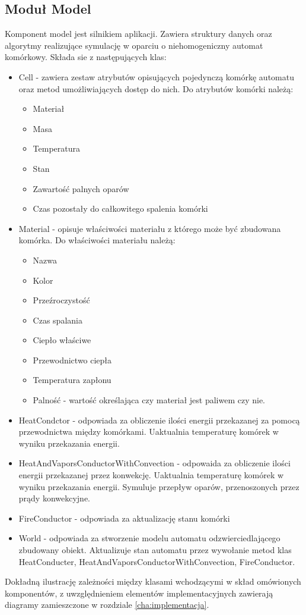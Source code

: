\subsection {Moduł Model}
Komponent model jest silnikiem aplikacji. Zawiera struktury danych oraz algorytmy realizujące symulację w oparciu o niehomogeniczny automat komórkowy. Składa sie z następujących klas:
\begin {itemize}
\item Cell - zawiera zestaw atrybutów opisujących pojedynczą komórkę automatu oraz metod umożliwiających dostęp do nich. Do atrybutów komórki należą:
\begin {itemize}
\item Materiał
\item Masa
\item Temperatura
\item Stan
\item Zawartość palnych oparów
\item Czas pozostały do całkowitego spalenia komórki
\end {itemize}
\item Material - opisuje właściwości materiału z którego może być zbudowana komórka.
Do właściwości materiału należą:
\begin {itemize}
\item Nazwa
\item Kolor
\item Przeźroczystość
\item Czas spalania
\item Ciepło właściwe
\item Przewodnictwo ciepła
\item Temperatura zapłonu
\item Palność - wartość określająca czy materiał jest paliwem czy nie.
\end {itemize}
\item HeatCondctor - odpowiada za obliczenie ilości energii przekazanej za pomocą przewodnictwa między komórkami. Uaktualnia temperaturę komórek w wyniku przekazania energii.  
\item HeatAndVaporsConductorWithConvection - odpowaida za obliczenie ilości energii przekazanej przez konwekcję. Uaktualnia temperaturę komórek w wyniku przekazania energii. Symuluje przepływ oparów, przenoszonych przez prądy konwekcyjne.
\item FireConductor - odpowiada za aktualizację stanu komórki
\item World - odpowiada za stworzenie modelu automatu odzwierciedlającego zbudowany obiekt. Aktualizuje stan automatu przez wywołanie metod klas HeatConducter, HeatAndVaporsConductorWithConvection, FireConductor.
\end {itemize}
Dokładną ilustrację zależności między klasami wchodzącymi w skład omówionych komponentów, z uwzględnieniem elementów implementacyjnych zawierają diagramy zamieszczone w rozdziale \ref{cha:implementacja}. %
 

